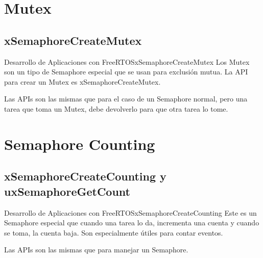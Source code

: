 \documentclass[aspectratio=169, xcolor=dvipsnames]{beamer}
\begin{document}
\section{Mutex}
\subsection{xSemaphoreCreateMutex}
\begin{frame}{Desarrollo de Aplicaciones con FreeRTOS}{xSemaphoreCreateMutex}
Los Mutex son un tipo de Semaphore especial que se usan para exclusión mutua.\newline
La API para crear un Mutex es \textcolor{myblue}{xSemaphoreCreateMutex}.\newline

Las APIs son las mismas que para el caso de un Semaphore normal, pero una tarea que toma un Mutex, debe devolverlo para que otra tarea lo tome.\newline
\end{frame}

\section{Semaphore Counting}
\subsection{xSemaphoreCreateCounting y uxSemaphoreGetCount}
\begin{frame}{Desarrollo de Aplicaciones con FreeRTOS}{xSemaphoreCreateCounting}
Este es un Semaphore especial que cuando una tarea lo da, incrementa una cuenta y cuando se toma, la cuenta baja.\newline
Son especialmente útiles para contar eventos.\newline

Las APIs son las mismas que para manejar un Semaphore.
\end{frame}
\end{document}
